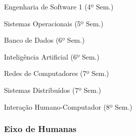 \begin{compenum}
    \item Engenharia de Software 1 (4º Sem.)
    \item Sistemas Operacionais (5º Sem.)
    \item Banco de Dados (6º Sem.)
    \item Inteligência Artificial (6º Sem.)
    \item Redes de Computadores (7º Sem.)
    \item Sistemas Distribuídos (7º Sem.)
    \item Interação Humano-Computador (8º Sem.)
\end{compenum}

\subsubsection{Eixo de Humanas}~\label{sec:E8}


